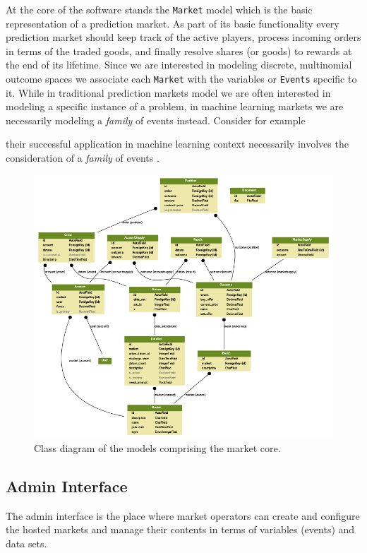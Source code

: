 \documentclass[bsc,frontabs,twoside,singlespacing,parskip,deptreport]{infthesis}     %
\begin{document}
    
    At the core of the software stands the {\tt Market} model which is the basic representation of a prediction market. As part of its basic functionality every prediction market should keep track of the active players, process incoming orders in terms of the traded goods, and finally resolve shares (or goods) to rewards at the end of its lifetime. Since we are interested in modeling discrete, multinomial outcome spaces we associate each {\tt Market} with the variables or {\tt Events} specific to it. While in traditional prediction markets model we are often interested in modeling a specific instance of a problem, in machine learning markets we are necessarily modeling a {\em family} of events instead. Consider for example 
    
     their successful application in machine learning context necessarily involves the consideration of a {\em family} of events . 


\begin{figure}
\centerline{ \includegraphics[scale=0.7]{markets_graph.png} }
\label{fig:class_diagram}
\caption{Class diagram of the models comprising the market core. }
\end{figure}

\subsection{Admin Interface}
The admin interface is the place where market operators can create and configure the hosted markets and manage their contents in terms of variables (events) and data sets. 
\end{document}
